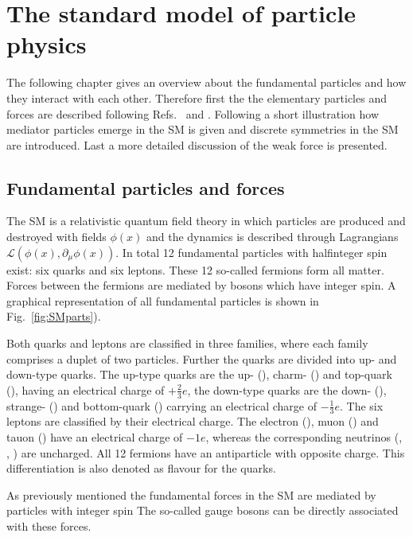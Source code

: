 \chapter{The standard model of particle physics}
\label{chap:SM}

The following chapter gives an overview about the fundamental particles and how they interact with each other. Therefore first
the the elementary particles and forces are described following Refs.~\cite{Griffiths:111880} and \cite{Perkins:396126}. Following
a short illustration how mediator particles emerge in the \ac{SM} is given and discrete symmetries in the \ac{SM} are introduced.
Last a more detailed discussion of the weak force is presented.

\section{Fundamental particles and forces}
\label{sec:fundamentalparts}

The \ac{SM} is a relativistic quantum field theory in which particles are produced and destroyed with fields $\phi(x)$ and the
dynamics is described through Lagrangians $\mathcal{L}\left(\phi(x),\partial_{\mu}\phi(x)\right)$. In total \num{12} fundamental
particles with halfinteger spin exist: six quarks and six leptons. These \num{12} so-called fermions form all matter. Forces
between the fermions are mediated by bosons which have integer spin. A graphical representation of all fundamental particles is
shown in Fig.~\cref{fig:SMparts}).

Both quarks and leptons are classified in three families, where each family comprises a duplet of two particles. Further the quarks
are divided into up- and down-type quarks. The up-type quarks are the up- (\uquark), charm- (\cquark) and top-quark (\tquark), having
an electrical charge of $+\frac{2}{3}e$, the down-type quarks are the down- (\dquark), strange- (\squark) and bottom-quark (\bquark)
carrying an electrical charge of $-\frac{1}{3}e$. The six leptons are classified by their electrical charge. The electron  (\electron),
muon (\muon) and tauon (\tauon) have an electrical charge of $-1e$, whereas the corresponding neutrinos (\neue, \neum, \neut) are
uncharged. All \num{12} fermions have an antiparticle with opposite charge. This differentiation is also denoted as flavour for the
quarks.

As previously mentioned the fundamental forces in the \ac{SM} are mediated by particles with integer spin The so-called gauge bosons
can be directly associated with these forces.

